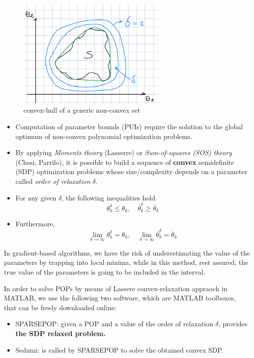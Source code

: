 \begin{figure}[htbp]  %
    \centering
    \includegraphics[width=0.65\textwidth]{images/convex-relaxation.png}
    \caption{convex-hull of a generic non-convex set}
    \label{fig:non-convex-FPS}
\end{figure}

\begin{itemize}
    \item Computation of parameter bounds (PUIs) require the solution to the global optimum of non-convex polynomial optimization problems.
    
    \item By applying \textit{Moments theory} (Lasserre) or \textit{Sum-of-squares (SOS) theory} (Chesi, Parrilo), it is possible to build a sequence of \textbf{convex} semidefinite (SDP) optimization problems whose size/complexity depends on a parameter called \textit{order of relaxation} \(\delta\).
    
    \item For any given \(\delta\), the following inequalities hold
    \[
    \theta^{\delta}_k \leq \theta_k, \quad \overline{\theta}^{\delta}_k \geq \overline{\theta}_k 
    \]
    
    \item Furthermore,
    \[
    \lim_{\delta \to \infty} \theta^{\delta}_k = \theta_k, \quad \lim_{\delta \to \infty} \overline{\theta}^{\delta}_k = \overline{\theta}_k
    \]
\end{itemize}

In gradient-based algorithms, we have the risk of underestimating the value of the parameters by trapping into local minima, while in this method, rest assured, the true value of the parameters is going to be included in the interval.

In order to solve POPs by means of Lassere convex-relaxation appraoch in MATLAB, we use the following two software, which are MATLAB toolboxes, that can be freely downloaded online:
\begin{itemize}
\item SPARSEPOP: given a POP and a value of the order of relaxation $\delta$, provides\textbf{ the SDP relaxed problem.}
\item Sedumi: is called by SPARSEPOP to solve the obtained convex SDP.
\end{itemize}

